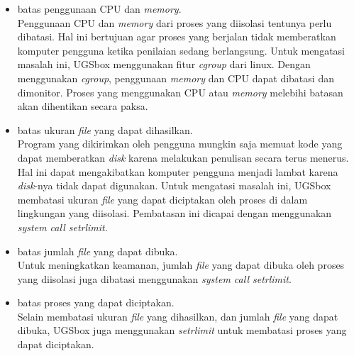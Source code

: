 \begin{itemize}
    \item batas penggunaan CPU dan \textit{memory}. \\ Penggunaan CPU dan \textit{memory} dari proses yang diisolasi tentunya perlu dibatasi. Hal ini bertujuan agar proses yang berjalan tidak memberatkan komputer pengguna ketika penilaian sedang berlangsung. Untuk mengatasi masalah ini, UGSbox menggunakan fitur \textit{cgroup} dari linux. Dengan menggunakan \textit{cgroup}, penggunaan \textit{memory} dan CPU dapat dibatasi dan dimonitor. Proses yang menggunakan CPU atau \textit{memory} melebihi batasan akan dihentikan secara paksa. 

    \item batas ukuran \textit{file} yang dapat dihasilkan. \\ Program yang dikirimkan oleh pengguna mungkin saja memuat kode yang dapat memberatkan \textit{disk} karena melakukan penulisan secara terus menerus. Hal ini dapat mengakibatkan komputer pengguna menjadi lambat karena \textit{disk}-nya tidak dapat digunakan. Untuk mengatasi masalah ini, UGSbox membatasi ukuran \textit{file} yang dapat diciptakan oleh proses di dalam lingkungan yang diisolasi. Pembatasan ini dicapai dengan menggunakan \textit{system call setrlimit}.

    \item batas jumlah \textit{file} yang dapat dibuka. \\ Untuk meningkatkan keamanan, jumlah \textit{file} yang dapat dibuka oleh proses yang diisolasi juga dibatasi menggunakan \textit{system call setrlimit}.

    \item batas proses yang dapat diciptakan. \\ Selain membatasi ukuran \textit{file} yang dihasilkan, dan jumlah \textit{file} yang dapat dibuka, UGSbox juga menggunakan \textit{setrlimit} untuk membatasi proses yang dapat diciptakan.

\end{itemize}

